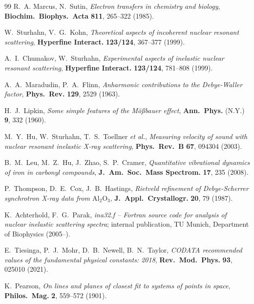 \documentclass[11pt,a4paper,twoside]{article}
\theoremstyle{remark}
\begin{document}
\begin{thebibliography}{99}
R.~A. Marcus, N.~Sutin,
\emph{Electron transfers in chemistry and biology},
\textbf{Biochim.\ Biophys.\ Acta} \textbf{811}, 265--322 (1985).

W.~Sturhahn, V.~G.~Kohn,
\emph{Theoretical aspects of incoherent nuclear resonant scattering},
\textbf{Hyperfine Interact.} \textbf{123/124}, 367--377 (1999).

A.~I.~Chumakov, W.~Sturhahn,
\emph{Experimental aspects of inelastic nuclear resonant scattering},
\textbf{Hyperfine Interact.} \textbf{123/124}, 781--808 (1999).

A.~A.~Maradudin, P.~A.~Flinn,
\emph{Anharmonic contributions to the Debye-Waller factor},
\textbf{Phys.\ Rev.} \textbf{129}, 2529 (1963).

H.~J.~Lipkin,
\emph{Some simple features of the M\"o\ss bauer effect},
\textbf{Ann.\ Phys.} (N.Y.) \textbf{9}, 332 (1960).

M.~Y.~Hu, W.~Sturhahn, T.~S.~Toellner \emph{et al.},
\emph{Measuring velocity of sound with nuclear resonant inelastic
X-ray scattering},
\textbf{Phys.\ Rev.\ B} \textbf{67}, 094304 (2003).

B.~M.~Leu, M.~Z.~Hu, J.~Zhao, S.~P.~Cramer,
\emph{Quantitative vibrational dynamics of iron in carbonyl compounds},
\textbf{J.\ Am.\ Soc.\ Mass Spectrom.} \textbf{17}, 235 (2008).

P.~Thompson, D.~E.~Cox, J.~B.~Hastings,
\emph{Rietveld refinement of Debye-Scherrer synchrotron X-ray data
from $\mathrm{Al}_2\mathrm{O}_3$},
\textbf{J.\ Appl.\ Crystallogr.} \textbf{20}, 79 (1987).

K.~Achterhold, F.~G.~Parak,
\emph{ina32.f -- Fortran source code for analysis of nuclear inelastic
scattering spectra}; internal publication, TU Munich, Department of
Biophysics (2005--).

E.~Tiesinga, P.~J.~Mohr, D.~B.~Newell, B.~N.~Taylor,
\emph{CODATA recommended values of the fundamental physical constants:
2018},
\textbf{Rev.\ Mod.\ Phys.} \textbf{93}, 025010 (2021).


K.~Pearson,
\emph{On lines and planes of closest fit to systems of points in space},
\textbf{Philos.\ Mag.} \textbf{2}, 559--572 (1901).


\end{thebibliography}
\end{document}
